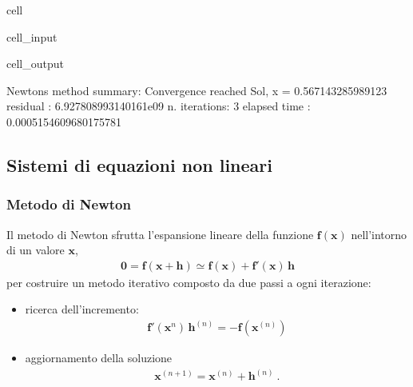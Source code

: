 \documentclass[letterpaper,10pt,english]{jupyterBook}
\begin{document}
\begin{sphinxuseclass}{cell}
\begin{sphinxVerbatimInput}
\begin{sphinxuseclass}{cell_input}
\end{sphinxuseclass}\end{sphinxVerbatimInput}
\begin{sphinxVerbatimOutput}

\begin{sphinxuseclass}{cell_output}
\begin{sphinxVerbatim}[commandchars=\\\{\}]
Newton\PYGZsq{}s method summary: 
Convergence reached
Sol, x = \PYGZhy{}0.567143285989123
residual     : 6.927808993140161e\PYGZhy{}09
n. iterations: 3
elapsed time : 0.0005154609680175781
\end{sphinxVerbatim}

\end{sphinxuseclass}\end{sphinxVerbatimOutput}

\end{sphinxuseclass}

\subsection{Sistemi di equazioni non lineari}
\label{\detokenize{ch/numerics/nonlinear:sistemi-di-equazioni-non-lineari}}

\subsubsection{Metodo di Newton}
\label{\detokenize{ch/numerics/nonlinear:id1}}
\sphinxAtStartPar
Il metodo di Newton sfrutta l’espansione lineare della funzione \(\mathbf{f}(\mathbf{x})\) nell’intorno di un valore \(\mathbf{x}\),
\begin{equation*}
\begin{split}\mathbf{0} = \mathbf{f}(\mathbf{x} + \mathbf{h}) \simeq \mathbf{f}(\mathbf{x}) + \mathbf{f}'(\mathbf{x}) \, \mathbf{h}\end{split}
\end{equation*}
\sphinxAtStartPar
per costruire un metodo iterativo composto da due passi a ogni iterazione:
\begin{itemize}
\item {} 
\sphinxAtStartPar
ricerca dell’incremento:
\begin{equation*}
\begin{split}\mathbf{f}'(\mathbf{x}^{n}) \, \mathbf{h}^{(n)} = - \mathbf{f}(\mathbf{x}^{(n)})\end{split}
\end{equation*}
\item {} 
\sphinxAtStartPar
aggiornamento della soluzione
\begin{equation*}
\begin{split}\mathbf{x}^{(n+1)} = \mathbf{x}^{(n)} + \mathbf{h}^{(n)} \ .\end{split}
\end{equation*}
\end{itemize}
\end{document}

